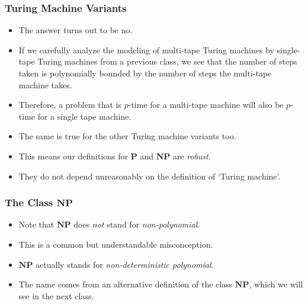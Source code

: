\documentclass[handout]{beamer}
\newcommand{\Po}{\mathbf{P}}
\newcommand{\NP}{\mathbf{NP}}
\begin{document}
\begin{frame}
\frametitle{Turing Machine Variants}
\begin{itemize}
\item  The answer turns out to be no.
\vspace{0.3cm}
\item If we carefully analyze the modeling of multi-tape Turing machines by single-tape Turing machines from a previous class, we see that the number of steps taken is polynomially bounded by the number of steps the multi-tape machine takes. 
\vspace{0.3cm}
\item Therefore, a problem that is $p$-time for a multi-tape machine will also be $p$-time for a single tape machine. 
\vspace{0.3cm}
\item The same is true for the other Turing machine variants too. 
\vspace{0.3cm}
\item This means our definitions for $\Po$ and $\NP$ are \emph{robust}. 
\vspace{0.3cm}
\item They do not depend unreasonably on the definition of `Turing machine'.     
\end{itemize} 
\end{frame}

\begin{frame}
\frametitle{The Class $\NP$}
\begin{itemize}   
\item Note that $\NP$ does \emph{not} stand for \emph{non-polynomial}. 
\vspace{1cm}
\item This is a common but understandable misconception. 
\vspace{1cm}
\item $\NP$ actually stands for \emph{non-deterministic polynomial}. 
\vspace{1cm}
\item The name comes from an alternative definition of the class $\NP$, which we will see in the next class.
\end{itemize} 
\end{frame}
\end{document}

